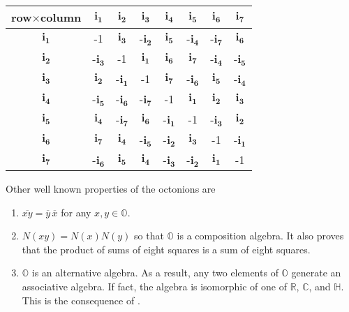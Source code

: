 \documentclass[12pt]{article}
\newcommand{\R}{\mathbb{R}}
\newcommand{\C}{\mathbb{C}}
\newcommand{\Q}{\mathbb{H}}
\newcommand{\Oc}{\mathbb{O}}
\newcommand{\conj}[1]{\overline{#1}}
\begin{document}
\begin{center}
\begin{tabular}{|c|c|c|c|c|c|c|c|}
\hline row$\times$column & $\mathbf{i_1}$ & $\mathbf{i_2}$ & $\mathbf{i_3}$ & $\mathbf{i_4}$ & $\mathbf{i_5}$ & $\mathbf{i_6}$ & $\mathbf{i_7}$ \\
\hline $\mathbf{i_1}$ & -1 & $\mathbf{i_3}$ & -$\mathbf{i_2}$ & $\mathbf{i_5}$ & -$\mathbf{i_4}$ & -$\mathbf{i_7}$ & $\mathbf{i_6}$ \\
\hline $\mathbf{i_2}$ & -$\mathbf{i_3}$ & -1 & $\mathbf{i_1}$ & $\mathbf{i_6}$ & $\mathbf{i_7}$ & -$\mathbf{i_4}$ & -$\mathbf{i_5}$ \\
\hline $\mathbf{i_3}$ & $\mathbf{i_2}$ & -$\mathbf{i_1}$ & -1 & $\mathbf{i_7}$ & -$\mathbf{i_6}$ & $\mathbf{i_5}$ & -$\mathbf{i_4}$ \\
\hline $\mathbf{i_4}$ & -$\mathbf{i_5}$ & -$\mathbf{i_6}$ & -$\mathbf{i_7}$ & -1 & $\mathbf{i_1}$ & $\mathbf{i_2}$ & $\mathbf{i_3}$ \\
\hline $\mathbf{i_5}$ & $\mathbf{i_4}$ & -$\mathbf{i_7}$ & $\mathbf{i_6}$ & -$\mathbf{i_1}$ & -1 & -$\mathbf{i_3}$ & $\mathbf{i_2}$ \\
\hline $\mathbf{i_6}$ & $\mathbf{i_7}$ & $\mathbf{i_4}$ & -$\mathbf{i_5}$ & -$\mathbf{i_2}$ & $\mathbf{i_3}$ & -1 & -$\mathbf{i_1}$ \\
\hline $\mathbf{i_7}$ & -$\mathbf{i_6}$ & $\mathbf{i_5}$ & $\mathbf{i_4}$ & -$\mathbf{i_3}$ & -$\mathbf{i_2}$ & $\mathbf{i_1}$ & -1 \\
\hline
\end{tabular}
\end{center}
Other well known properties of the octonions are
\begin{enumerate}
\item $\conj{xy}=\conj{y}\hspace{2pt}\conj{x}$ for any $x,y\in\Oc$.
\item $N(xy)=N(x)N(y)$ so that $\Oc$ is a composition algebra.  It also proves that the product of sums of eight squares is a sum of eight squares.
\item $\Oc$ is an alternative algebra.  As a result, any two elements of $\Oc$ generate an associative algebra.  If fact, the algebra is isomorphic of one of $\R$, $\C$, and $\Q$.  This is the consequence of .
\end{enumerate}
\end{document}
